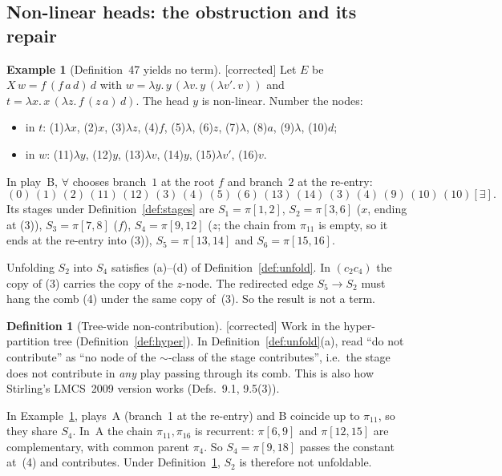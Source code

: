 \documentclass[11pt]{article}
\newcommand{\iv}[2]{\pi[#1,#2]}
\newcommand{\Fixed}{\textsf{[corrected]}}
\theoremstyle{plain}
\theoremstyle{definition}
\newtheorem{definition}[theorem]{Definition}
\newtheorem{example}[theorem]{Example}
\theoremstyle{remark}
\begin{document}
\subsection{Non-linear heads: the obstruction and its repair}\label{sec:nonlinear}

\begin{example}[Definition~47 yields no term]\label{ex:obstruction}
\Fixed{} Let $E$ be $X\,w=f\,(f\,a\,d)\,d$ with
$w=\lambda y.\,y\,(\lambda v.\,y\,(\lambda v'.\,v))$ and
$t=\lambda x.\,x\,(\lambda z.\,f\,(z\,a)\,d)$.  The head $y$ is
non-linear.  Number the nodes:
\begin{itemize}
\item in $t$: (1)$\lambda x$, (2)$x$, (3)$\lambda z$, (4)$f$, (5)$\lambda$,
  (6)$z$, (7)$\lambda$, (8)$a$, (9)$\lambda$, (10)$d$;
\item in $w$: (11)$\lambda y$, (12)$y$, (13)$\lambda v$, (14)$y$,
  (15)$\lambda v'$, (16)$v$.
\end{itemize}
In play~B, $\forall$ chooses branch~$1$ at the root $f$ and branch~$2$
at the re-entry:
\[
(0)\,(1)\,(2)\,(11)\,(12)\,(3)\,(4)\,(5)\,(6)\,(13)\,(14)\,(3)\,(4)\,(9)\,(10)\,(10)[\exists].
\]
Its stages under Definition~\ref{def:stages} are
$S_1=\iv12$, $S_2=\iv36$ ($x$, ending at (3)), $S_3=\iv78$ ($f$),
$S_4=\iv9{12}$ ($z$; the chain from $\pi_{11}$ is empty, so it ends at
the re-entry into (3)), $S_5=\iv{13}{14}$ and $S_6=\iv{15}{16}$.

Unfolding $S_2$ into $S_4$ satisfies (a)--(d) of
Definition~\ref{def:unfold}.  In $(c_2c_4)$ the copy of (3) carries the
copy of the $z$-node.  The redirected edge $S_5\to S_2$ must hang the
comb (4) under the same copy of~(3).  So the result is not a term.
\end{example}

\begin{definition}[Tree-wide non-contribution]\label{def:47a}
\Fixed{} Work in the hyper-partition tree (Definition~\ref{def:hyper}).
In Definition~\ref{def:unfold}(a), read ``do not contribute'' as ``no
node of the $\sim$-class of the stage contributes'', i.e.\ the stage
does not contribute in \emph{any} play passing through its comb.  This is
also how Stirling's LMCS~2009 version works (Defs.~9.1, 9.5(3)).
\end{definition}

In Example~\ref{ex:obstruction}, plays~A (branch~1 at the re-entry) and
B coincide up to $\pi_{11}$, so they share $S_4$.  In~A the chain
$\pi_{11},\pi_{16}$ is recurrent: $\iv69$ and $\iv{12}{15}$ are
complementary, with common parent $\pi_4$.  So $S_4=\iv9{18}$ passes
the constant at~(4) and contributes.  Under Definition~\ref{def:47a},
$S_2$ is therefore not unfoldable.
\end{document}
